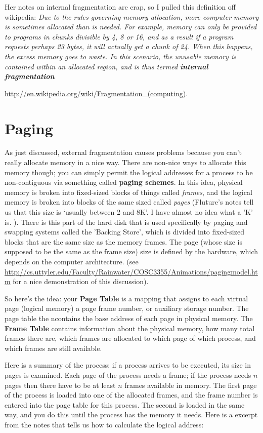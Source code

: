 \documentclass{article}
\begin{document}
Her notes on internal fragmentation are crap, so I pulled this definition off wikipedia: \emph{Due to the rules governing memory allocation, more computer memory is sometimes allocated than is needed. For example, memory can only be provided to programs in chunks divisible by 4, 8 or 16, and as a result if a program requests perhaps 23 bytes, it will actually get a chunk of 24. When this happens, the excess memory goes to waste. In this scenario, the unusable memory is contained within an allocated region, and is thus termed {\bf internal fragmentation}}


\url{http://en.wikipedia.org/wiki/Fragmentation_(computing)}.


\section{Paging}

As just discussed, external fragmentation causes problems because you can't really allocate memory in a nice way. There are non-nice ways to allocate this memory though; you can simply permit the logical addresses for a process to be non-contiguous via something called {\bf paging schemes}. In this idea, physical memory is broken into fixed-sized blocks of things called \emph{frames}, and the logical memory is broken into blocks of the same sized called \emph{pages} (Fluture's notes tell us that this size is `usually between 2 and 8K'. I have almost no idea what a 'K' is. ). There is this part of the hard disk that is used specifically by paging and swapping systems called the 'Backing Store', which is divided into fixed-sized blocks that are the same size as the memory frames. The page (whose size is supposed to be the same as the frame size) size is defined by the hardware, which depends on the computer architecture. 
(see \url{http://cs.uttyler.edu/Faculty/Rainwater/COSC3355/Animations/pagingmodel.htm} for a nice demonstration of this discussion). 

So here's the idea: your {\bf Page Table} is a mapping that assigns to each virtual page (logical memory) a page frame number, or auxiliary storage number. The page table the ncontains the base address of each page in physical memory. The {\bf Frame Table} contains information about the physical memory, how many total frames there are, which frames are allocated to which page of which process, and which frames are still available. 

Here is a summary of the process: if a process arrives to be executed, its size in pages is examined. Each page of the process needs a frame; if the process needs $n$ pages then there have to be at least $n$ frames available in memory. The first page of the process is loaded into one of the allocated frames, and the frame number is entered into the page table for this process. The second is loaded in the same way, and you do this until the process has the memory it needs. Here is a excerpt from the notes that tells us how to calculate the logical address: 
\end{document}
